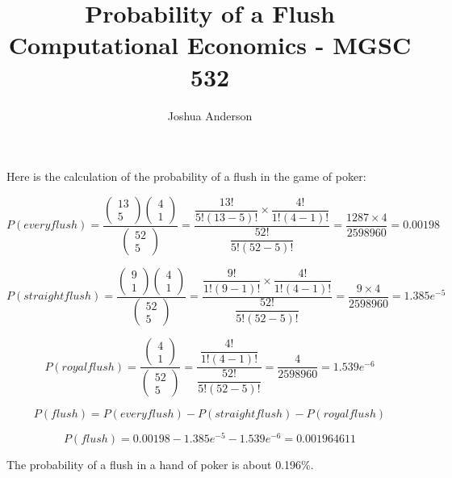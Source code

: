 \documentclass{article}
\begin{document}
\title{%
  Probability of a Flush \\
  \large Computational Economics - MGSC 532}
\author{Joshua Anderson}

\maketitle

\begin{*}
    Here is the calculation of the probability of a flush in
    the game of poker:
\end{*}

\begin{equation}
    P(every flush) = 
    \dfrac{
        \begin{pmatrix}13 \\ 5\end{pmatrix}
        \begin{pmatrix}4 \\ 1\end{pmatrix}
    }{
        \begin{pmatrix}52 \\ 5\end{pmatrix}
    }
    =
    \dfrac{
        \dfrac{13!}{5!(13-5)!}\times\dfrac{4!}{1!(4-1)!}
    }{
        \dfrac{52!}{5!(52-5)!}
    }
    =
    \dfrac{1287\times4}{2598960}
    =
    0.00198
\end{equation}

\begin{equation}
    P(straight flush) = 
    \dfrac{
        \begin{pmatrix}9 \\ 1\end{pmatrix}
        \begin{pmatrix}4 \\ 1\end{pmatrix}
    }{
        \begin{pmatrix}52 \\ 5\end{pmatrix}
    }
    =
    \dfrac{
        \dfrac{9!}{1!(9-1)!}\times\dfrac{4!}{1!(4-1)!}
    }{
        \dfrac{52!}{5!(52-5)!}
    }
    =
    \dfrac{9\times4}{2598960}
    =
    1.385e^{-5}
\end{equation}

\begin{equation}
    P(royal flush) = 
    \dfrac{
        \begin{pmatrix}4 \\ 1\end{pmatrix}
    }{
        \begin{pmatrix}52 \\ 5\end{pmatrix}
    }
    =
    \dfrac{\dfrac{4!}{1!(4-1)!}}{\dfrac{52!}{5!(52-5)!}}
    =
    \dfrac{4}{2598960}
    =
    1.539e^{-6}
\end{equation}

\begin{equation}
    P(flush) = P(every flush) - P(straight flush) - P(royal flush)
\end{equation}

\begin{equation}
    P(flush) = 0.00198 - 1.385e^{-5} - 1.539e^{-6} = 0.001964611
\end{equation}
\newline

\begin{center}
The probability of a flush in a hand of poker is about 0.196\%.
\end{center}
\end{document}
